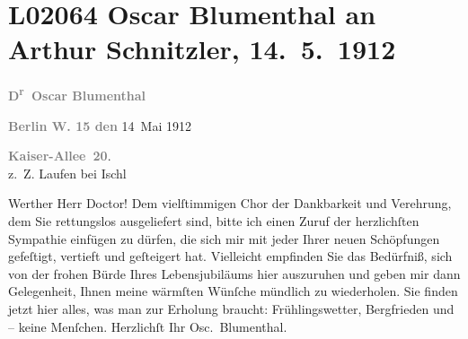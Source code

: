 

\section[Oscar Blumenthal an Arthur Schnitzler, 14. 5. 1912]{L02064 Oscar Blumenthal an Arthur Schnitzler, 14. 5. 1912}
\nopagebreak{}
\rehead{ }\normalsize\beginnumbering{}
\toendnotes[C]{\smallbreak\pagebreak[2]}
\toendnotes[C]{\smallbreak}
\toendnotes[C]{\smallbreak}
\pstart
           
\pstart
           {\pb}\textcolor{gray}{\textbf{D\textsuperscript{r} Oscar Blumenthal}}\pend
           
\pstart
           \raggedleft{}\textcolor{gray}{\textbf{Berlin W. 15 den}}{ }14 Mai 1912\pend
           \pend
           
\pstart
           \raggedleft{}\textcolor{gray}{\textbf{Kaiser-Allee 20}}.{\\}z. Z. Laufen bei Ischl\pend
           
\pstart\center{}Werther Herr Doctor!\pend\vspace{0.5em}
\pstart
           Dem vielſtimmigen Chor der Dankbarkeit und Verehrung, dem Sie \label{K_L02064-1v}\label{K_L02064-1} rettungslos ausgeliefert sind, bitte ich einen
               Zuruf der herzlichſten Sympathie einfügen zu dürfen, die sich mir mit jeder Ihrer
               neuen Schöpfungen gefeſtigt, vertieft und geſteigert hat. Vielleicht empfinden Sie
               das Bedürfniß, sich von der frohen Bürde Ihres Lebensjubiläums hier auszuruhen und
               geben mir dann Gelegenheit, Ihnen meine wärmſten Wünſche mündlich zu wiederholen. Sie
               finden jetzt hier alles, was man zur Erholung braucht: Frühlingswetter, Bergfrieden
               und – keine Menſchen. Herzlichſt Ihr\pend
           \pstart \spacefill\mbox{Osc. Blumenthal.}\pend{}\endnumbering{}  \newcommand{\dateiname}{L02064}\newcommand{\titel}{Oscar Blumenthal an Arthur Schnitzler, 14. 5. 1912}\newcommand{\editorInnen}{Martin Anton Müller und Gerd-Hermann Susen}
